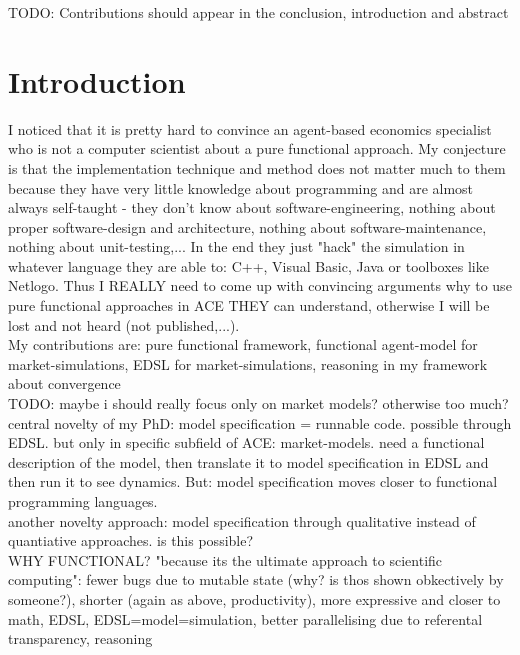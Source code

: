 \documentclass{article}
\begin{document}

TODO: Contributions should appear in the conclusion, introduction and abstract


\section{Introduction}

I noticed that it is pretty hard to convince an agent-based economics specialist who is not a computer scientist about a pure functional approach. My conjecture is that the implementation technique and method does not matter much to them because they have very little knowledge about programming and are almost always self-taught - they don't know about software-engineering, nothing about proper software-design and architecture, nothing about software-maintenance, nothing about unit-testing,... In the end they just "hack" the simulation in whatever language they are able to: C++, Visual Basic, Java or toolboxes like Netlogo. Thus I REALLY need to come up with convincing arguments why to use pure functional approaches in ACE THEY can understand, otherwise I will be lost and not heard (not published,...). \\

My contributions are: pure functional framework, functional agent-model for market-simulations, EDSL for market-simulations, reasoning in my framework about convergence \\

TODO: maybe i should really focus only on market models? otherwise too much? \\

central novelty of my PhD: model specification = runnable code. possible through EDSL. but only in specific subfield of ACE: market-models. need a functional description of the model, then translate it to model specification in EDSL and then run it to see dynamics. But: model specification moves closer to functional programming languages. \\

another novelty approach: model specification through qualitative instead of quantiative approaches. is this possible? \\

WHY FUNCTIONAL? "because its the ultimate approach to scientific computing": fewer bugs due to mutable state (why? is thos shown obkectively by someone?), shorter (again as above, productivity), more expressive and closer to math, EDSL, EDSL=model=simulation, better parallelising due to referental transparency, reasoning \\
\end{document}
